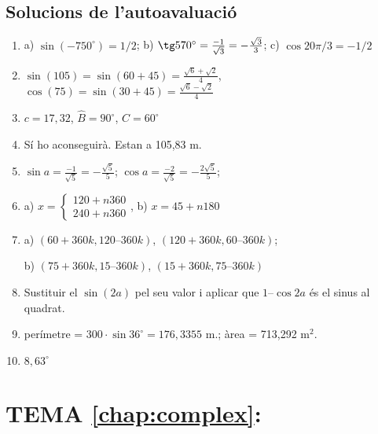 \subsection*{Solucions de l'autoavaluació}
\begin{enumerate} 
	\item a) $\sin(-750^\circ)=1/2$; \quad b) $\tg 570^\circ=\frac{-1}{\sqrt 3}=-\frac{\sqrt 3}{3}$;  \quad 
	c)  $\cos 20\pi/3 = -1/2$
	
	\item $\sin(105)=\sin(60+45)=\frac{\sqrt{6}+\sqrt{2}}{4}$,\quad
	$\cos(75)=\sin(30+45)=\frac{\sqrt{6}-\sqrt{2}}{4}$
	
	\item $c=17,32$, $\hat B=90^\circ$, $\hat C=60^\circ$
	\item Sí ho aconseguirà. Estan a 105,83 m.
	\item $\sin a=\frac{-1}{\sqrt 5}=-\frac{\sqrt 5}{5}$;\quad
	      $\cos a=\frac{-2}{\sqrt 5}=-\frac{2\sqrt 5}{5}$;
	\item a) $x=\left\{\begin{array}{l} 120 + n 360 \\ 240 +n 360 \end{array}\right.$,  \quad b) $x=45 + n 180$
	\item a) $(60+360k,120–360k)$, $(120+360k,60–360k)$;
	
	  b) $(75+360k, 15–360k)$, $(15+360k, 75–360k)$
	
	\item Sustituir el $\sin(2a)$ pel seu valor i aplicar  que $1–\cos 2a$ és el sinus al quadrat.
	
	\item perímetre = $300\cdot \sin 36^\circ = 176,3355$ m.; \quad àrea = 713,292 m$^2$.
	
	\item $8,63^\circ$
 
\end{enumerate}



\section*{TEMA \ref{chap:complex}: }
